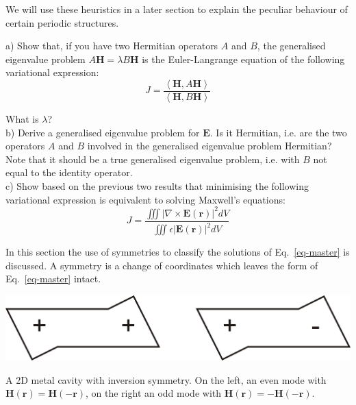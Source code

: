 We will use these heuristics in a later section to explain the peculiar behaviour of certain periodic structures.

\pagebreak

\begin{exer}
   
a) Show that, if you have two Hermitian operators $A$ and $B$, the generalised eigenvalue problem $A {\mathbf H} = \lambda B {\mathbf H}$ is the Euler-Langrange equation of the following variational expression: \\

$$J = \frac{\left\langle {\mathbf H} , A {\mathbf H}\right\rangle}{\left\langle {\mathbf H} , B {\mathbf H}\right\rangle}$$

What is $\lambda$? \\

b) Derive a generalised eigenvalue problem for $\mathbf E$. Is it Hermitian, i.e. are the two operators $A$ and $B$ involved in the generalised eigenvalue problem Hermitian? Note that it should be a true generalised eigenvalue problem, i.e. with $B$ not equal to the identity operator.  \\

c) Show based on the previous two results that minimising the following variational expression is equivalent to solving Maxwell's equations: \\

$$J=\frac{\iiint \left| \nabla \times {\mathbf E ({\mathbf r})} \right| ^2  dV} {\iiint \epsilon \left| {\mathbf E ({\mathbf r})} \right| ^2  dV}$$

\end{exer}


\pagebreak



In this section the use of symmetries to classify the solutions of Eq.~\ref{eq-master} is discussed.  A symmetry is a change of coordinates which leaves the form of Eq.~\ref{eq-master} intact.  

\begin{marginfigure}
\centering
\includegraphics{symmetry/figures/symmcav}
\caption{A 2D metal cavity with inversion symmetry. On the left, an even mode with ${\mathbf H}({\mathbf r}) = {\mathbf H}(-{\mathbf r})$, on the right an odd mode with ${\mathbf H}({\mathbf r})=-{\mathbf H}(-{\mathbf r})$.}
\label{fig-symmcav}
\end{marginfigure}

